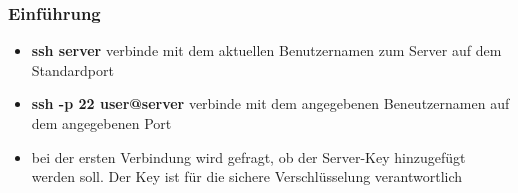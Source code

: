 \begin{frame}
\frametitle{Einführung}
\begin{itemize}
\item \textbf{ssh server} verbinde mit dem aktuellen Benutzernamen zum Server auf dem Standardport
\pause
\item \textbf{ssh -p 22 user@server} verbinde mit dem angegebenen Beneutzernamen auf dem angegebenen Port
\pause
\item bei der ersten Verbindung wird gefragt, ob der Server-Key hinzugefügt werden soll. Der Key ist für die sichere Verschlüsselung verantwortlich 
\end{itemize}
\end{frame}